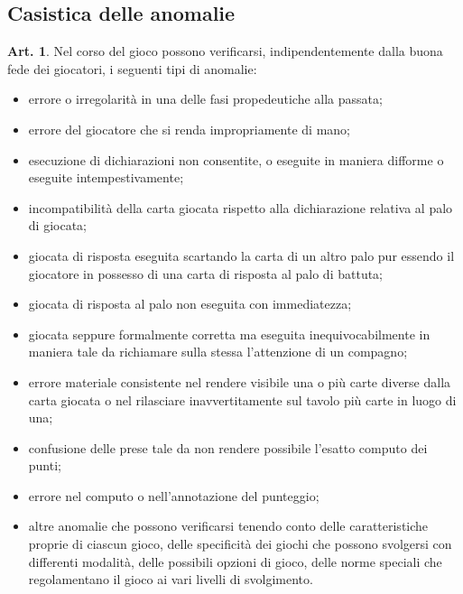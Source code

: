 \documentclass[italian,a4paper]{book}
\theoremstyle{definition}
\newtheorem{art}{Art.}
\newenvironment{packeditem}{
\begin{itemize}
  \setlength{\itemsep}{1pt}
  \setlength{\parskip}{0pt}
  \setlength{\parsep}{0pt}
}{\end{itemize}}
\begin{document}
\subsection{Casistica delle anomalie}
\begin{art}
    Nel corso del gioco possono verificarsi, indipendentemente dalla buona fede dei giocatori, i seguenti tipi di anomalie:
    \begin{packeditem}
\item errore o irregolarità in una delle fasi propedeutiche alla passata;
\item errore del giocatore che si renda impropriamente di mano;
\item esecuzione di dichiarazioni non consentite, o eseguite in maniera difforme o eseguite intempestivamente;
\item incompatibilità della carta giocata rispetto alla dichiarazione relativa al palo di giocata;
\item giocata di risposta eseguita scartando la carta di un altro palo pur essendo il giocatore in possesso di una carta di risposta al palo di battuta;
\item  giocata di risposta al palo non eseguita con immediatezza;
\item giocata seppure formalmente corretta ma eseguita inequivocabilmente in maniera tale da richiamare sulla stessa l'attenzione di un compagno;
\item errore materiale consistente nel rendere visibile una o più carte diverse dalla carta giocata o nel rilasciare inavvertitamente sul tavolo più carte in luogo di una;
\item   confusione delle prese tale da non rendere possibile l'esatto computo dei punti;
\item   errore nel computo o nell'annotazione del punteggio;
\item altre anomalie che possono verificarsi tenendo conto delle caratteristiche proprie di ciascun gioco, delle specificità dei giochi che possono svolgersi con differenti modalità, delle possibili opzioni di gioco, delle norme speciali che regolamentano il gioco ai vari livelli di svolgimento.
    \end{packeditem}
\end{art}
\end{document}
